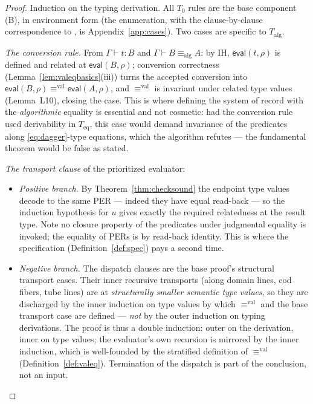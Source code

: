 \documentclass{lmcs}
\newcommand{\aconv}{\equiv_{\mathrm{alg}}}
\newcommand{\valeq}{\equiv^{\mathrm{val}}}
\newcommand{\evalop}{\mathsf{eval}}
\begin{document}
\begin{proof}
  Induction on the typing derivation.  All $T_0$ rules are the base
  component (B), in environment form (the enumeration, with the
  clause-by-clause correspondence to \cite{HuberNorm}, is
  Appendix~\ref{app:cases}).  Two cases are specific to
  $T_{\mathrm{alg}}$.

  \emph{The conversion rule.}  From $\Gamma \vdash t : B$ and
  $\Gamma \vdash B \aconv A$: by IH, $\evalop(t,\rho)$ is defined and
  related at $\evalop(B,\rho)$; conversion correctness
  (Lemma~\ref{lem:valeqbasics}(iii)) turns the accepted conversion
  into $\evalop(B,\rho) \valeq \evalop(A,\rho)$, and $\valeq$ is
  invariant under related type values (Lemma~L10), closing the case.
  This is where defining the system of record with the
  \emph{algorithmic} equality is essential and not cosmetic: had the
  conversion rule used derivability in $T_{\mathrm{eq}}$, this case
  would demand invariance of the predicates along
  \eqref{eq:dagger}-type equations, which the algorithm refutes ---
  the fundamental theorem would be false as stated.

  \emph{The transport clause} of the prioritized evaluator:
  \begin{itemize}
  \item \emph{Positive branch.}  By Theorem~\ref{thm:checksound} the
    endpoint type values decode to the same PER --- indeed they have
    equal read-back --- so the induction hypothesis for $u$ gives
    exactly the required relatedness at the result type.  Note no
    closure property of the predicates under judgmental equality is
    invoked; the equality of PERs is by read-back identity.  This is
    where the specification (Definition~\ref{def:spec}) pays a
    second time.
  \item \emph{Negative branch.}  The dispatch clauses are the base
    proof's structural transport cases.  Their inner recursive
    transports (along domain lines, cod fibers, tube lines) are at
    \emph{structurally smaller semantic type values}, so they are
    discharged by the inner induction on type values by which
    $\valeq$ and the base transport case are defined --- \emph{not}
    by the outer induction on typing derivations.  The proof is thus
    a double induction: outer on the derivation, inner on type
    values; the evaluator's own recursion is mirrored by the inner
    induction, which is well-founded by the stratified definition of
    $\valeq$ (Definition~\ref{def:valeq}).  Termination of the
    dispatch is part of the conclusion, not an input.
  \end{itemize}
\end{proof}
\end{document}
